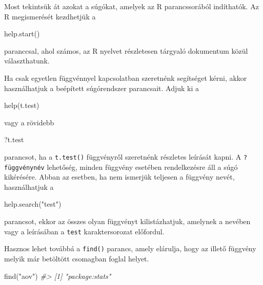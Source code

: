 \documentclass[
]{book}
\newenvironment{Shaded}{\begin{snugshade}}{\end{snugshade}}
\newcommand{\CommentTok}[1]{\textcolor[rgb]{0.56,0.35,0.01}{\textit{#1}}}
\newcommand{\FunctionTok}[1]{\textcolor[rgb]{0.00,0.00,0.00}{#1}}
\newcommand{\NormalTok}[1]{#1}
\newcommand{\StringTok}[1]{\textcolor[rgb]{0.31,0.60,0.02}{#1}}
\begin{document}
Most tekintsük át azokat a súgókat, amelyek az R parancssorából indíthatók. Az R megismerését kezdhetjük a

\begin{Shaded}
\begin{Highlighting}[]
\FunctionTok{help.start}\NormalTok{()}
\end{Highlighting}
\end{Shaded}

paranccsal, ahol számos, az R nyelvet részletesen tárgyaló dokumentum közül választhatunk.

Ha csak egyetlen függvénnyel kapcsolatban szeretnénk segítséget kérni, akkor használhatjuk a beépített súgórendszer parancsait. Adjuk ki a

\begin{Shaded}
\begin{Highlighting}[]
\FunctionTok{help}\NormalTok{(t.test)}
\end{Highlighting}
\end{Shaded}

vagy a rövidebb

\begin{Shaded}
\begin{Highlighting}[]
\NormalTok{ ?t.test}
\end{Highlighting}
\end{Shaded}

parancsot, ha a \texttt{t.test()} függvényről szeretnénk részletes leírását kapni. A \texttt{?függvénynév} lehetőség, minden függvény esetében rendelkezésre áll a súgó kikérésére. Abban az esetben, ha nem ismerjük teljesen a függvény nevét, használhatjuk a

\begin{Shaded}
\begin{Highlighting}[]
\FunctionTok{help.search}\NormalTok{(}\StringTok{"test"}\NormalTok{)}
\end{Highlighting}
\end{Shaded}

parancsot, ekkor az összes olyan függvényt kilistázhatjuk, amelynek a nevében vagy a leírásában a \texttt{test} karaktersorozat előfordul.

Hasznos lehet továbbá a \texttt{find()} parancs, amely elárulja, hogy az illető függvény melyik már betöltött csomagban foglal helyet.

\begin{Shaded}
\begin{Highlighting}[]
\FunctionTok{find}\NormalTok{(}\StringTok{"aov"}\NormalTok{)}
\CommentTok{\#\textgreater{} [1] "package:stats"}
\end{Highlighting}
\end{Shaded}
\end{document}
